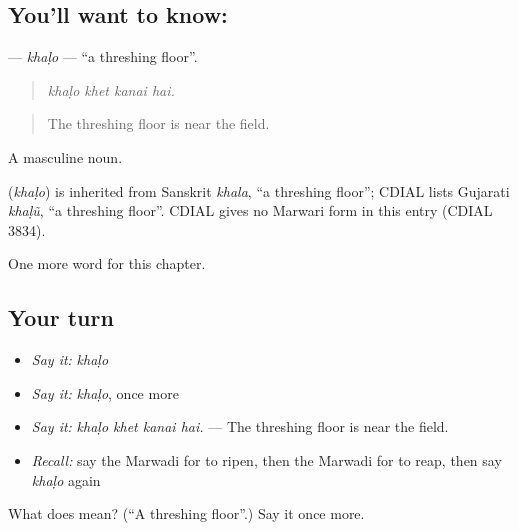 \subsection*{You'll want to know: }
\textbf{} — \emph{khaḷo} — \textquotedblleft{}a threshing floor\textquotedblright{}.

\begin{quote}
   
\end{quote}

\begin{quote}
\emph{khaḷo khet kanai hai.}
\end{quote}

\begin{quote}
The threshing floor is near the field.
\end{quote}

A masculine noun.

\begin{cousinweb}
\textbf{} (\emph{khaḷo}) is inherited from Sanskrit \emph{khala}, \textquotedblleft{}a threshing floor\textquotedblright{}; CDIAL lists Gujarati \emph{khaḷũ}, \textquotedblleft{}a threshing floor\textquotedblright{}. CDIAL gives no Marwari form in this entry (CDIAL 3834).
\end{cousinweb}

\begin{grammarlens}[title={What you've built}]
One more word for this chapter.
\end{grammarlens}

\subsection*{Your turn}
\begin{itemize}
\raggedright
  \item \emph{Say it:} \emph{khaḷo}
  \item \emph{Say it:} \emph{khaḷo}, once more
  \item \emph{Say it:} \emph{khaḷo khet kanai hai.} — The threshing floor is near the field.
  \item \emph{Recall:} say the Marwadi for to ripen, then the Marwadi for to reap, then say \emph{khaḷo} again
\end{itemize}

\begin{tcolorbox}[breakable,colback=teal!4,colframe=teal!35!black,title={Before you move on}]
What does  mean? (\textquotedblleft{}A threshing floor\textquotedblright{}.) Say it once more.
\end{tcolorbox}
